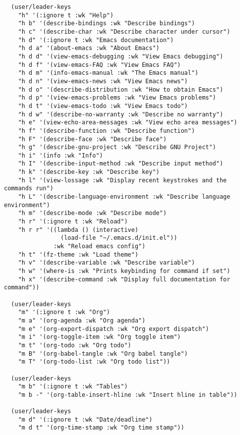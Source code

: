 \documentclass[11pt]{article}
\begin{document}
\begin{verbatim}
  (user/leader-keys
    "h" '(:ignore t :wk "Help")
    "h b" '(describe-bindings :wk "Describe bindings")
    "h c" '(describe-char :wk "Describe character under cursor")
    "h d" '(:ignore t :wk "Emacs documentation")
    "h d a" '(about-emacs :wk "About Emacs")
    "h d d" '(view-emacs-debugging :wk "View Emacs debugging")
    "h d f" '(view-emacs-FAQ :wk "View Emacs FAQ")
    "h d m" '(info-emacs-manual :wk "The Emacs manual")
    "h d n" '(view-emacs-news :wk "View Emacs news")
    "h d o" '(describe-distribution :wk "How to obtain Emacs")
    "h d p" '(view-emacs-problems :wk "View Emacs problems")
    "h d t" '(view-emacs-todo :wk "View Emacs todo")
    "h d w" '(describe-no-warranty :wk "Describe no warranty")
    "h e" '(view-echo-area-messages :wk "View echo area messages")
    "h f" '(describe-function :wk "Describe function")
    "h F" '(describe-face :wk "Describe face")
    "h g" '(describe-gnu-project :wk "Describe GNU Project")
    "h i" '(info :wk "Info")
    "h I" '(describe-input-method :wk "Describe input method")
    "h k" '(describe-key :wk "Describe key")
    "h l" '(view-lossage :wk "Display recent keystrokes and the commands run")
    "h L" '(describe-language-environment :wk "Describe language environment")
    "h m" '(describe-mode :wk "Describe mode")
    "h r" '(:ignore t :wk "Reload")
    "h r r" '((lambda () (interactive)
                (load-file "~/.emacs.d/init.el"))
              :wk "Reload emacs config")
    "h t" '(fz-theme :wk "Load theme")
    "h v" '(describe-variable :wk "Describe variable")
    "h w" '(where-is :wk "Prints keybinding for command if set")
    "h x" '(describe-command :wk "Display full documentation for command"))

  (user/leader-keys
    "m" '(:ignore t :wk "Org")
    "m a" '(org-agenda :wk "Org agenda")
    "m e" '(org-export-dispatch :wk "Org export dispatch")
    "m i" '(org-toggle-item :wk "Org toggle item")
    "m t" '(org-todo :wk "Org todo")
    "m B" '(org-babel-tangle :wk "Org babel tangle")
    "m T" '(org-todo-list :wk "Org todo list"))

  (user/leader-keys
    "m b" '(:ignore t :wk "Tables")
    "m b -" '(org-table-insert-hline :wk "Insert hline in table"))

  (user/leader-keys
    "m d" '(:ignore t :wk "Date/deadline")
    "m d t" '(org-time-stamp :wk "Org time stamp"))


\end{verbatim}
\end{document}
